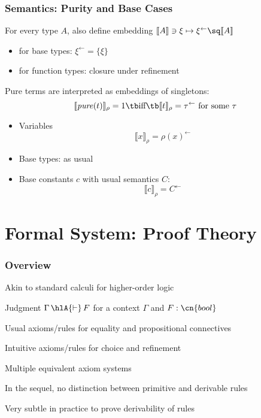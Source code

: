 \documentclass{beamer}
\def\prop{\cn{bool}}
\def\pure#1{\mathit{pure}(#1)}
\def\der{\,\hlA{\vdash}\,}
\def\sem#1{\llbracket#1\rrbracket}
\def\seme#1#2{\llbracket#1\rrbracket_{#2}}
\def\semr#1{\seme{#1}{\rho}}
\def\rc#1{#1^\leftarrow}
\begin{document}
\begin{frame}\frametitle{Semantics: Purity and Base Cases}
For every type $A$, also define embedding $\sem{A}\ni \xi\mapsto \rc{\xi}\sq\sem{A}$
\begin{itemize}
 \item for base types: $\rc{\xi}=\{\xi\}$
 \item for function types: closure under refinement
\end{itemize}

Pure terms are interpreted as embeddings of singletons:
\[\semr{\pure{t}}=1 \tb\text{iff}\tb \semr{t}=\rc{\tau}\text{ for some } \tau\]

\begin{itemize}
\item Variables
\[\seme{x}{\rho} = \rc{\rho(x)}\]
\glec{note: $\rho(x)\in\sem{A}$, not $\rho(x)\sq\sem{A}$}
\item Base types: as usual
\item Base constants $c$ with usual semantics $C$:
  \[\semr{c}=\rc{C}\]
\end{itemize}
\end{frame}

\section{Formal System: Proof Theory}

\begin{frame}\frametitle{Overview}
\begin{blockitems}{Akin to standard calculi for higher-order logic}
\item Judgment $\Gamma\der F$ for a context $\Gamma$ and $F:\prop$
\item Usual axioms/rules for equality and propositional connectives
\item Intuitive axioms/rules for choice and refinement
\end{blockitems}

\begin{blockitems}{Multiple equivalent axiom systems}
\item In the sequel, no distinction between primitive and derivable rules
\item Very subtle in practice to prove derivability of rules
\end{blockitems}
\end{frame}
\end{document}
